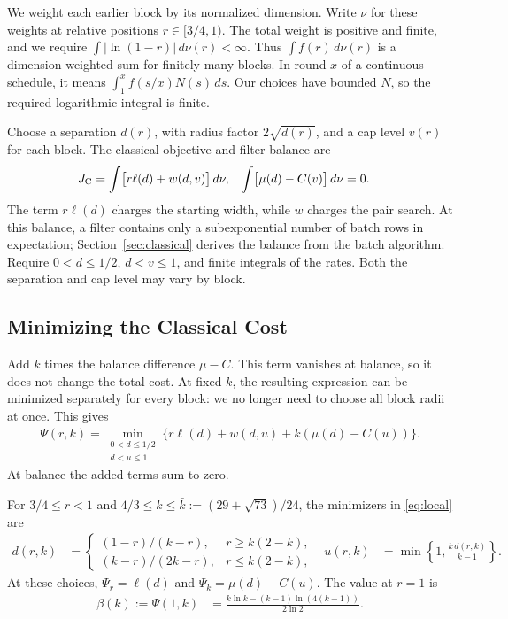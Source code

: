 \documentclass[runningheads,envcountsame,envcountsect,orivec]{llncs}
\begin{document}
We weight each earlier block by its normalized dimension. Write
$\nu$ for these weights at relative positions $r\in[3/4,1)$.
The total weight is positive and finite, and we require
$\int|\ln(1-r)|\,d\nu(r)<\infty$. Thus $\int f(r)\,d\nu(r)$
is a dimension-weighted sum for finitely many blocks. In round
$x$ of a continuous schedule, it means
$\int_1^x f(s/x)N(s)\,ds$. Our choices have bounded $N$, so the
required logarithmic integral is finite.

Choose a separation $d(r)$, with radius factor $2\sqrt{d(r)}$,
and a cap level $v(r)$ for each block. The classical objective
and filter balance are
\begin{align}
 J_{\rm C}
   &=\int\bigl[r\ell(d)+w(d,v)\bigr]\,d\nu,
 &\int\bigl[\mu(d)-C(v)\bigr]\,d\nu&=0.
 \label{eq:separation-c}
\end{align}
The term $r\ell(d)$ charges the starting width, while $w$ charges
the pair search. At this balance, a filter contains only a subexponential number of batch
rows in expectation; Section~\ref{sec:classical} derives the balance
from the batch algorithm.
Require $0<d\le1/2$, $d<v\le1$, and finite integrals of the rates.
Both the separation and cap level may vary by block.

\subsection{Minimizing the Classical Cost}

Add $k$ times the balance difference $\mu-C$. This term vanishes
at balance, so it does not change the total cost. At fixed $k$,
the resulting expression can be minimized separately for every block:
we no longer need to choose all block radii at once. This gives
\begin{align}
 \Psi(r,k)
   =\min_{\substack{0<d\le1/2\\d<u\le1}}
      \{r\ell(d)+w(d,u)+k(\mu(d)-C(u))\}.
 \label{eq:local}
\end{align}
At balance the added terms sum to zero.

\begin{lemma}
\label{lem:local}
For $3/4\le r<1$ and $4/3\le k\le\bar k:=(29+\sqrt{73})/24$,
the minimizers in \eqref{eq:local} are
\begin{align}
 d(r,k)&=
 \begin{cases}
  (1-r)/(k-r),&r\ge k(2-k),\\
  (k-r)/(2k-r),&r\le k(2-k),
 \end{cases}
 &
 u(r,k)&=\min\left\{1,\frac{k\,d(r,k)}{k-1}\right\}.
 \label{eq:control}
\end{align}
At these choices, $\Psi_r=\ell(d)$ and
$\Psi_k=\mu(d)-C(u)$. The value at $r=1$ is
\begin{align}
 \beta(k):=\Psi(1,k)
   &=\frac{k\ln k-(k-1)\ln(4(k-1))}{2\ln 2}.
 \label{eq:beta}
\end{align}
\end{lemma}
\end{document}
